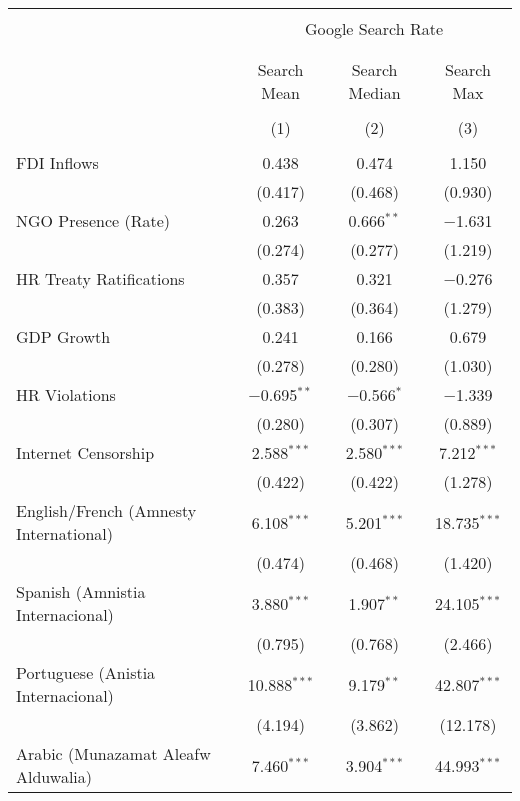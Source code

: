 
\begin{table}[!htbp] \centering 
  \caption{} 
  \label{} 
\begin{tabular}{@{\extracolsep{5pt}}lccc} 
\\[-1.8ex]\hline 
\hline \\[-1.8ex] 
 & \multicolumn{3}{c}{Google Search Rate} \\ 
\cline{2-4} 
\\[-1.8ex] & \multicolumn{3}{c}{ } \\ 
 & Search Mean & Search Median & Search Max \\ 
\\[-1.8ex] & (1) & (2) & (3)\\ 
\hline \\[-1.8ex] 
 FDI Inflows & 0.438 & 0.474 & 1.150 \\ 
  & (0.417) & (0.468) & (0.930) \\ 
  NGO Presence (Rate) & 0.263 & 0.666$^{**}$ & $-$1.631 \\ 
  & (0.274) & (0.277) & (1.219) \\ 
  HR Treaty Ratifications & 0.357 & 0.321 & $-$0.276 \\ 
  & (0.383) & (0.364) & (1.279) \\ 
  GDP Growth & 0.241 & 0.166 & 0.679 \\ 
  & (0.278) & (0.280) & (1.030) \\ 
  HR Violations & $-$0.695$^{**}$ & $-$0.566$^{*}$ & $-$1.339 \\ 
  & (0.280) & (0.307) & (0.889) \\ 
  Internet Censorship & 2.588$^{***}$ & 2.580$^{***}$ & 7.212$^{***}$ \\ 
  & (0.422) & (0.422) & (1.278) \\ 
  English/French (Amnesty International) & 6.108$^{***}$ & 5.201$^{***}$ & 18.735$^{***}$ \\ 
  & (0.474) & (0.468) & (1.420) \\ 
  Spanish (Amnistia Internacional) & 3.880$^{***}$ & 1.907$^{**}$ & 24.105$^{***}$ \\ 
  & (0.795) & (0.768) & (2.466) \\ 
  Portuguese (Anistia Internacional) & 10.888$^{***}$ & 9.179$^{**}$ & 42.807$^{***}$ \\ 
  & (4.194) & (3.862) & (12.178) \\ 
  Arabic (Munazamat Aleafw Alduwalia) & 7.460$^{***}$ & 3.904$^{***}$ & 44.993$^{***}$ \\ 

\end{tabular}
\end{table}
